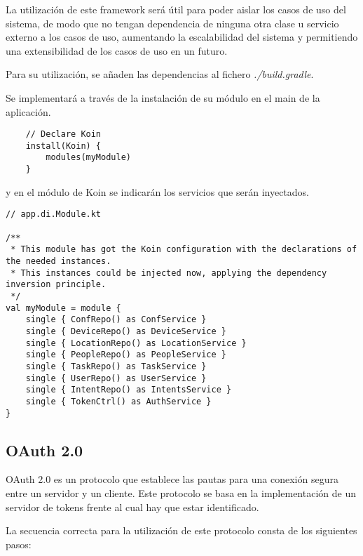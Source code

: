 La utilización de este framework será útil para poder aislar los casos de uso del sistema, de modo que no tengan dependencia de ninguna otra clase u servicio externo a los casos de uso, aumentando la escalabilidad del sistema y permitiendo una extensibilidad de los casos de uso en un futuro.

Para su utilización, se añaden las dependencias al fichero \textit{./build.gradle}.

Se implementará a través de la instalación de su módulo en el main de la aplicación.
\begin{lstlisting}
    // Declare Koin
    install(Koin) {
        modules(myModule)
    }
\end{lstlisting}

y en el módulo de Koin se indicarán los servicios que serán inyectados.
\begin{lstlisting}
// app.di.Module.kt

/**
 * This module has got the Koin configuration with the declarations of the needed instances.
 * This instances could be injected now, applying the dependency inversion principle.
 */
val myModule = module {
    single { ConfRepo() as ConfService }
    single { DeviceRepo() as DeviceService }
    single { LocationRepo() as LocationService }
    single { PeopleRepo() as PeopleService }
    single { TaskRepo() as TaskService }
    single { UserRepo() as UserService }
    single { IntentRepo() as IntentsService }
    single { TokenCtrl() as AuthService }
}
\end{lstlisting}


    \subsection{OAuth 2.0}
    \label{oauth20}
    
OAuth 2.0 es un protocolo que establece las pautas para una conexión segura entre un servidor y un cliente.
Este protocolo se basa en la implementación de un servidor de tokens frente al cual hay que estar identificado.~\cite{oauth2}

La secuencia correcta para la utilización de este protocolo consta de los siguientes pasos:

